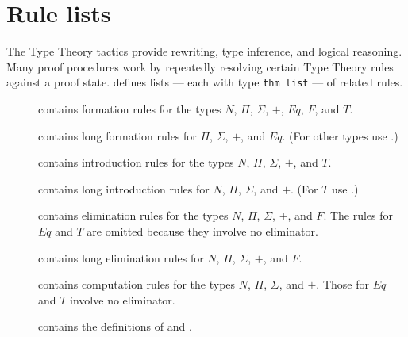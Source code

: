 \section{Rule lists}
The Type Theory tactics provide rewriting, type inference, and logical
reasoning.  Many proof procedures work by repeatedly resolving certain Type
Theory rules against a proof state.  {\CTT} defines lists --- each with
type
\hbox{\tt thm list} --- of related rules. 
\begin{description}
\item[] 
contains formation rules for the types $N$, $\Pi$, $\Sigma$, $+$, $Eq$,
$F$, and $T$.

\item[] 
contains long formation rules for $\Pi$, $\Sigma$, $+$, and $Eq$.  (For
other types use .)

\item[] 
contains introduction rules for the types $N$, $\Pi$, $\Sigma$, $+$, and
$T$.

\item[] 
contains long introduction rules for $N$, $\Pi$, $\Sigma$, and $+$.  (For
$T$ use .)

\item[] 
contains elimination rules for the types $N$, $\Pi$, $\Sigma$, $+$, and
$F$.  The rules for $Eq$ and $T$ are omitted because they involve no
eliminator.

\item[] 
contains long elimination rules for $N$, $\Pi$, $\Sigma$, $+$, and $F$.

\item[] 
contains computation rules for the types $N$, $\Pi$, $\Sigma$, and $+$.
Those for $Eq$ and $T$ involve no eliminator.

\item[] 
contains the definitions of  and .  
\end{description}


